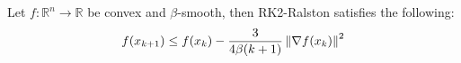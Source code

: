 \begin{lemma} \label{lemma_2}
Let $f: \mathbb{R}^{n} \rightarrow \mathbb{R}$ be convex and $\beta$-smooth, then RK2-Ralston satisfies the following:
\begin{align*}
f(x_{k + 1}) \leq f(x_{k}) - \frac{3}{4 \beta ( k + 1)} \left\lVert\nabla f(x_k)\right\rVert^{2}
\end{align*}
\end{lemma}



